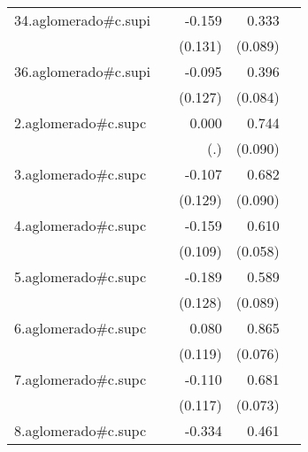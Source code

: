 {\begin{longtable}{l*{4}{D{.}{.}{-1}}}
\addlinespace
34.aglomerado#c.supi&                     &      -0.159         &       0.333\sym{***}&                     \\
            &                     &     (0.131)         &     (0.089)         &                     \\
\addlinespace
36.aglomerado#c.supi&                     &      -0.095         &       0.396\sym{***}&                     \\
            &                     &     (0.127)         &     (0.084)         &                     \\
\addlinespace
2.aglomerado#c.supc&                     &       0.000         &       0.744\sym{***}&                     \\
            &                     &         (.)         &     (0.090)         &                     \\
\addlinespace
3.aglomerado#c.supc&                     &      -0.107         &       0.682\sym{***}&                     \\
            &                     &     (0.129)         &     (0.090)         &                     \\
\addlinespace
4.aglomerado#c.supc&                     &      -0.159         &       0.610\sym{***}&                     \\
            &                     &     (0.109)         &     (0.058)         &                     \\
\addlinespace
5.aglomerado#c.supc&                     &      -0.189         &       0.589\sym{***}&                     \\
            &                     &     (0.128)         &     (0.089)         &                     \\
\addlinespace
6.aglomerado#c.supc&                     &       0.080         &       0.865\sym{***}&                     \\
            &                     &     (0.119)         &     (0.076)         &                     \\
\addlinespace
7.aglomerado#c.supc&                     &      -0.110         &       0.681\sym{***}&                     \\
            &                     &     (0.117)         &     (0.073)         &                     \\
\addlinespace
8.aglomerado#c.supc&                     &      -0.334\sym{**} &       0.461\sym{***}&                     \\

\end{longtable}}
